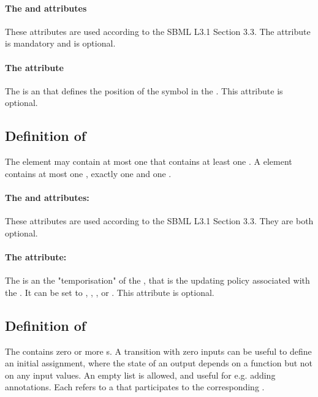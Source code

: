 \paragraph{The  and  attributes}
These attributes are used according to the SBML L3.1 Section 3.3. The attribute  is mandatory and  is optional. 

\paragraph{The  attribute}
The  is an  that defines the position of the symbol in the . This attribute is optional.

\bigskip
\subsection*{Definition of  } %
The  element may contain at most one  that contains at least one .
A  element contains at most one , exactly one  and one .

\paragraph{The  and  attributes:}
These attributes are used according to the SBML L3.1 Section 3.3. They are both optional. 

\paragraph{The  attribute:}
The  is an  the "temporisation" of the , that is the updating policy associated with the . It can be set to , , ,  or .
This attribute is optional. 

\bigskip
\subsection*{Definition of } %
The  contains zero or more s. A transition with zero inputs can be useful to define an initial assignment, where the state of an output depends on a function but not on any input values. An empty list is allowed, and useful for e.g. adding annotations.
Each  refers to a  that participates to the corresponding .

